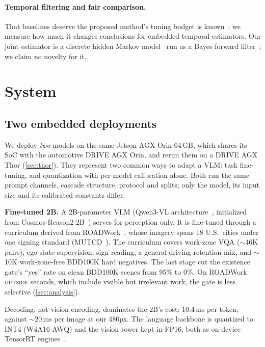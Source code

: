 \documentclass[conference]{IEEEtran}
\let\oldtextsc\textsc
\renewcommand{\textsc}[1]{\mbox{\oldtextsc{#1}}}
\begin{document}
\paragraph{Temporal filtering and fair comparison.} That baselines deserve the proposed method's tuning budget is known~\cite{melis2018state}; we measure how much it changes conclusions for embedded temporal estimators.  Our joint estimator is a discrete hidden Markov model~\cite{rabiner1989hmm} run as a Bayes forward filter~\cite{thrun2005probabilistic}; we claim no novelty for it.

\section{System}
\label{sec:system}

\subsection{Two embedded deployments}
\label{sec:deployment}

We deploy \emph{two} models on the same Jetson AGX Orin 64\,GB, which shares its SoC with the automotive DRIVE AGX Orin, and rerun them on a DRIVE AGX Thor (\cref{sec:thor}).  They represent two common ways to adapt a VLM: task fine-tuning, and quantization with per-model calibration alone.  Both run the same prompt channels, cascade structure, protocol and splits; only the model, its input size and its calibrated constants differ.

\textbf{Fine-tuned 2B.}  A 2B-parameter VLM (Qwen3-VL architecture~\cite{qwen3vl}, initialized from Cosmos-Reason2-2B~\cite{nvidia2025cosmosreason2}) serves for perception only.  It is fine-tuned through a curriculum derived from ROADWork~\cite{ghosh2025roadwork}, whose imagery spans 18 U.S.\ cities under one signing standard (MUTCD~\cite{mutcd2009}).  The curriculum covers work-zone VQA ($\sim$46K pairs), ego-state supervision, sign reading, a general-driving retention mix, and $\sim$10K work-zone-free BDD100K hard negatives.  The last stage cut the existence gate's ``yes'' rate on clean BDD100K scenes from 95\% to 0\%.  On ROADWork \textsc{outside} seconds, which include visible but irrelevant work, the gate is less selective (\cref{sec:analysis}).

Decoding, not vision encoding, dominates the 2B's cost: 10.4\,ms per token, against $\sim$20\,ms per image at our 480px.  The language backbone is quantized to INT4 (W4A16 AWQ) and the vision tower kept in FP16, both as on-device TensorRT engines~\cite{trtedgellm}.
\end{document}
